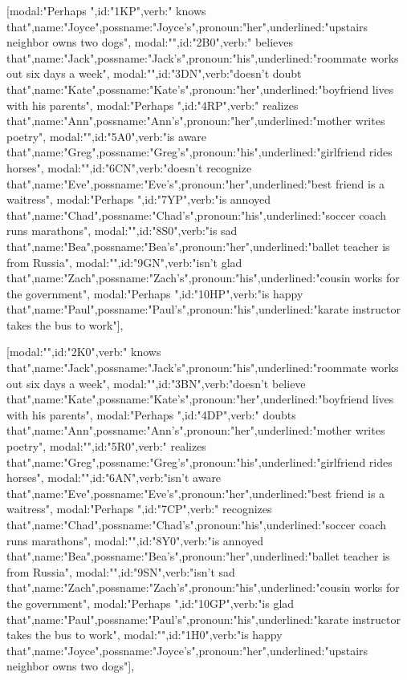 [{modal:"Perhaps ",id:"1KP",verb:" knows that",name:"Joyce",possname:"Joyce's",pronoun:"her",underlined:"upstairs neighbor owns two dogs"},
{modal:"",id:"2B0",verb:" believes that",name:"Jack",possname:"Jack's",pronoun:"his",underlined:"roommate works out six days a week"},
{modal:"",id:"3DN",verb:"doesn't doubt that",name:"Kate",possname:"Kate's",pronoun:"her",underlined:"boyfriend lives with his parents"},
{modal:"Perhaps ",id:"4RP",verb:" realizes that",name:"Ann",possname:"Ann's",pronoun:"her",underlined:"mother writes poetry"},
{modal:"",id:"5A0",verb:"is aware that",name:"Greg",possname:"Greg's",pronoun:"his",underlined:"girlfriend rides horses"},
{modal:"",id:"6CN",verb:"doesn't recognize that",name:"Eve",possname:"Eve's",pronoun:"her",underlined:"best friend is a waitress"},
{modal:"Perhaps ",id:"7YP",verb:"is annoyed that",name:"Chad",possname:"Chad's",pronoun:"his",underlined:"soccer coach runs marathons"},
{modal:"",id:"8S0",verb:"is sad that",name:"Bea",possname:"Bea's",pronoun:"her",underlined:"ballet teacher is from Russia"},
{modal:"",id:"9GN",verb:"isn't glad that",name:"Zach",possname:"Zach's",pronoun:"his",underlined:"cousin works for the government"},
{modal:"Perhaps ",id:"10HP",verb:"is happy that",name:"Paul",possname:"Paul's",pronoun:"his",underlined:"karate instructor takes the bus to work"}],

[{modal:"",id:"2K0",verb:" knows that",name:"Jack",possname:"Jack's",pronoun:"his",underlined:"roommate works out six days a week"},
{modal:"",id:"3BN",verb:"doesn't believe that",name:"Kate",possname:"Kate's",pronoun:"her",underlined:"boyfriend lives with his parents"},
{modal:"Perhaps ",id:"4DP",verb:" doubts that",name:"Ann",possname:"Ann's",pronoun:"her",underlined:"mother writes poetry"},
{modal:"",id:"5R0",verb:" realizes that",name:"Greg",possname:"Greg's",pronoun:"his",underlined:"girlfriend rides horses"},
{modal:"",id:"6AN",verb:"isn't aware that",name:"Eve",possname:"Eve's",pronoun:"her",underlined:"best friend is a waitress"},
{modal:"Perhaps ",id:"7CP",verb:" recognizes that",name:"Chad",possname:"Chad's",pronoun:"his",underlined:"soccer coach runs marathons"},
{modal:"",id:"8Y0",verb:"is annoyed that",name:"Bea",possname:"Bea's",pronoun:"her",underlined:"ballet teacher is from Russia"},
{modal:"",id:"9SN",verb:"isn't sad that",name:"Zach",possname:"Zach's",pronoun:"his",underlined:"cousin works for the government"},
{modal:"Perhaps ",id:"10GP",verb:"is glad that",name:"Paul",possname:"Paul's",pronoun:"his",underlined:"karate instructor takes the bus to work"},
{modal:"",id:"1H0",verb:"is happy that",name:"Joyce",possname:"Joyce's",pronoun:"her",underlined:"upstairs neighbor owns two dogs"}],

